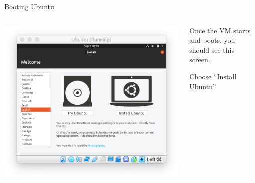\documentclass[11pt]{beamer}
\begin{document}
\begin{frame}{Booting Ubuntu}
  \begin{columns}
    \begin{column}{0.65\linewidth}
      \includegraphics[width=\linewidth]{ubuntu}
    \end{column}
    \begin{column}{0.35\linewidth}
      Once the VM starts and boots, you should see this screen.

      Choose ``Install Ubuntu''
    \end{column}
  \end{columns}
\end{frame}
\end{document}
